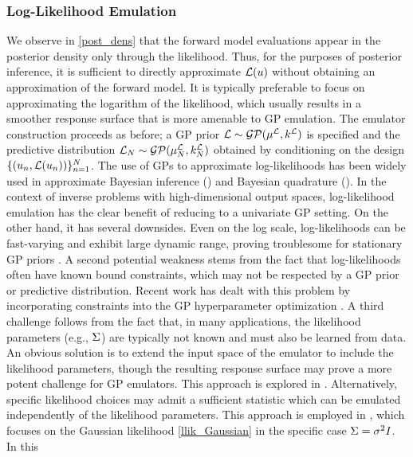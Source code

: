 \documentclass[12pt]{article}
\begin{document}
\subsubsection{Log-Likelihood Emulation}
We observe in \ref{post_dens} that the forward model evaluations appear in the posterior density only through the 
likelihood. Thus, for the purposes of posterior inference, it is sufficient to directly approximate $\llik(\Par)$ without 
obtaining an approximation of the forward model. It is typically preferable to focus on approximating the logarithm 
of the likelihood, which usually results in a smoother response surface that is more amenable to GP emulation. 
The emulator construction proceeds as before; a GP prior $\llik \sim \GP(\emMeanPrior{\llik}, \emKerPrior{\llik})$ 
is specified and the predictive 
distribution $\llikEm[\Ndesign] \sim \GP(\emMean[\Ndesign]{\llik}, \emKer[\Ndesign]{\llik})$ obtained by 
conditioning on the design $\{(\Par_{\idxDesign}, \llik(\Par_{\idxDesign}))\}_{\idxDesign=1}^{\Ndesign}$. 
The use of GPs to approximate log-likelihoods has been widely used in approximate Bayesian inference 
(\cite{VehtariParallelGP, Kandasamy_2017, llikRBF, trainDynamics, quantileApprox, wang2018adaptive, landslideCalibration})
and Bayesian quadrature (\cite{BayesQuadrature, BayesQuadRatios}). In the context of inverse problems with 
high-dimensional output spaces, log-likelihood emulation has the clear benefit of reducing to a univariate GP setting. 
On the other hand, it has several downsides. Even on the log scale, log-likelihoods can be fast-varying and exhibit large 
dynamic range, proving troublesome for stationary GP priors \cite{wang2018adaptive}. A second potential weakness 
stems from the fact that log-likelihoods often have known bound constraints, which may not be respected by a GP 
prior or predictive distribution. Recent work has dealt with this problem by incorporating constraints into the 
GP hyperparameter optimization \cite{quantileApprox}. A third challenge follows from the fact that, in many applications, 
the likelihood parameters (e.g., $\likPar$) are typically not known and must also be learned from data. An obvious 
solution is to extend the input space of the emulator to include the likelihood parameters, though the resulting response surface 
may prove a more potent challenge for GP emulators. This approach is explored in \cite{llikRBF}. Alternatively, specific likelihood 
choices may admit a sufficient statistic which can be emulated independently of the likelihood parameters. This approach is employed 
in \cite{FerEmulation}, which focuses on the Gaussian likelihood \ref{llik_Gaussian} in the specific case $\likPar = \sigma^2 I$. In this 
\end{document}
